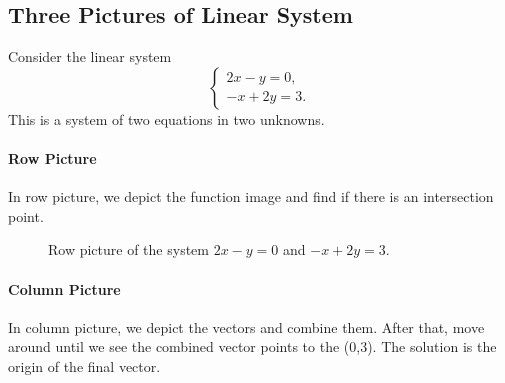 \documentclass[11pt]{article}
\theoremstyle{definition}
\begin{document}
\subsection{Three Pictures of Linear System}


Consider the linear system
\[
\begin{cases}
2x-y=0,\\
-x+2y=3.
\end{cases}
\]
This is a system of two equations in two unknowns. 

\paragraph{Row Picture} In row picture, we depict the function image and find if there is an intersection point. 

\begin{figure}[H]
\centering
{}
\caption{Row picture of the system \(2x-y=0\) and \(-x+2y=3\).}
\end{figure}

\paragraph{Column Picture} In column picture, we depict the vectors and combine them. After that, move around until we see the combined vector points to the (0,3). The solution is the origin of the final vector.
\end{document}
